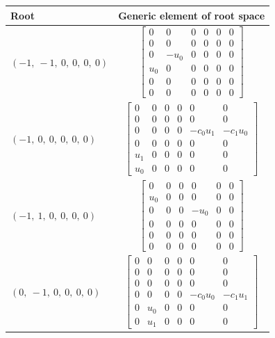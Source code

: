 \documentclass[11pt]{article}
\theoremstyle{definition}
\begin{document}
\bigskip

\noindent \begin{longtable}{|l|c|}
    \hline
    \textbf{Root} & \textbf{Generic element of root space} \\
    \hline
    \endhead
    $\left( -1, \  -1, \  0, \  0, \  0, \  0\right)$ & ${\left[\begin{matrix}0 & 0 & 0 & 0 & 0 & 0\\0 & 0 & 0 & 0 & 0 & 0\\0 & - u_{0} & 0 & 0 & 0 & 0\\u_{0} & 0 & 0 & 0 & 0 & 0\\0 & 0 & 0 & 0 & 0 & 0\\0 & 0 & 0 & 0 & 0 & 0\end{matrix}\right]}$ \\
    \hline
    $\left( -1, \  0, \  0, \  0, \  0, \  0\right)$ & ${\left[\begin{matrix}0 & 0 & 0 & 0 & 0 & 0\\0 & 0 & 0 & 0 & 0 & 0\\0 & 0 & 0 & 0 & - c_{0} u_{1} & - c_{1} u_{0}\\0 & 0 & 0 & 0 & 0 & 0\\u_{1} & 0 & 0 & 0 & 0 & 0\\u_{0} & 0 & 0 & 0 & 0 & 0\end{matrix}\right]}$ \\
    \hline
    $\left( -1, \  1, \  0, \  0, \  0, \  0\right)$ & ${\left[\begin{matrix}0 & 0 & 0 & 0 & 0 & 0\\u_{0} & 0 & 0 & 0 & 0 & 0\\0 & 0 & 0 & - u_{0} & 0 & 0\\0 & 0 & 0 & 0 & 0 & 0\\0 & 0 & 0 & 0 & 0 & 0\\0 & 0 & 0 & 0 & 0 & 0\end{matrix}\right]}$ \\
    \hline
    $\left( 0, \  -1, \  0, \  0, \  0, \  0\right)$ & ${\left[\begin{matrix}0 & 0 & 0 & 0 & 0 & 0\\0 & 0 & 0 & 0 & 0 & 0\\0 & 0 & 0 & 0 & 0 & 0\\0 & 0 & 0 & 0 & - c_{0} u_{0} & - c_{1} u_{1}\\0 & u_{0} & 0 & 0 & 0 & 0\\0 & u_{1} & 0 & 0 & 0 & 0\end{matrix}\right]}$ \\

\end{longtable}
\end{document}
